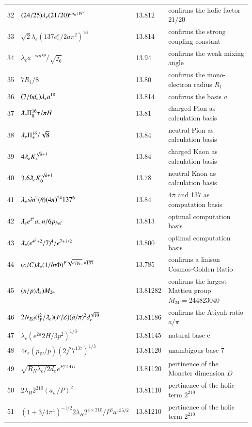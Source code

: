 \documentclass[a4paper,9pt]{article}
\begin{document}
\begin{appendix}
\begin{table}
\begin{tabular}{llll}
   32 & $ (24/25) \lambdabar_e (21/20)^{aa_w/W^2} $ & 13.812 & confirms the holic factor $21/20$  \\
   33 & $ \sqrt2 \lambda_e (137 e^a_s/2a\pi^2)^{16} $ & 13.814 & confirms the strong coupling constant  \\     
   34 & $ \lambda_{e} a^{-sin^4\theta}/\sqrt {j_0}  $   & 13.94 & confirms the weak mixing angle \\ 
   35 & $7R_1/8  $   & 13.80 & confirms the mono-electron radius $R_1$ \\   
   36 & $ (7/6d_e) \lambdabar_{e} a^{18} $ & 13.814 & confirms the basis $a$ \\
   37 & $\lambdabar_{e} \Pi_0^{16} \tau/\pi H $ & 13.81 & charged Pion as calculation basis \\    
   38 & $\lambdabar_{e} \Pi_+^{16} /\sqrt 8 $ & 13.84 &  neutral Pion as calculation basis \\
   39 & $ 4 \lambdabar_{e} K_+^{\sqrt a + 1} $ & 13.84 & charged Kaon as calculation basis \\
   40 & $3.6 \lambdabar_{e} K_0^{\sqrt a + 1}$ & 13.78 & neutral Kaon as calculation basis \\
   41 & $ \lambdabar_{e} sin^2(\theta) (4\pi)^{24} 137^6 $ & 13.84 & $4\pi$ and 137 as computation basis \\
   
    42 & $ \lambdabar_{e} e^{2^6} a_w n/6p_{hol} $ & 13.813 &  optimal computation basis \\
    
    43 & $ \lambdabar_{e} (e^{4^7+2}/7)^4 /e^{7+1/2}$ & 13.800 &  optimal computation basis \\
    
    44 & $ (c/C)\lambdabar_{e} (1/ln\Phi)^{F \sqrt{a/p_G} \sqrt{137}}$ & 13.785 &  confirms a liaison Cosmos-Golden Ratio\\
    45 & $ (n/p)\lambdabar_e) M_{24} $ & 13.81282 & confirms the largest Mattieu group $M_{24} = 244823040 $\\   
    46 & $2N_{Ed}(l_P^2/\lambdabar_e) (F/Z) (a/\pi)^2 d_e^{\sqrt{10}} $ & 13.81186 & confirms the Atiyah ratio $a/\pi$\\ 
    47& $\lambda_{e} (e^{2a}2H/3p^2)^{1/3}$ & 13.81145 & natural base e\\
    48& $4r_e (p_W/p) (2j^2 7^{137})^{1/3} $ & 13.81120 & unambigous base 7 \\
    49& $ \sqrt{R_N \lambda_{e} /2d_e} e^{P/2AD} $ & 13.81120 & pertinence of the Monster dimension $D$ \\
    50& $ 2\lambda_{H} 2^{210} (a_w/P)^2 $ & 13.81110 & pertinence of the holic term $2^{210}$ \\
    51& $(1+3/4\pi^4)^{-1/2}  2\lambda_{H} 2^{4\times210}/P^3 a^{135/2}  $ & 13.81210 & pertinence of the holic term $2^{210} $\\
    

\end{tabular}
\end{table}
\end{appendix}
\end{document}
